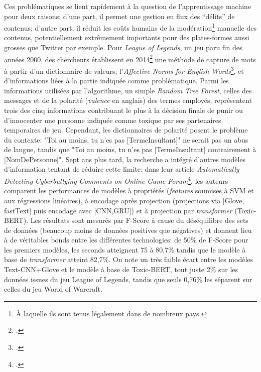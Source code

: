Ces problématiques se lient rapidement à la question de l'apprentissage machine pour deux raisons: d'une part, il permet une gestion en flux des \enquote{délits} de contenus; d'autre part, il réduit les coûts humains de la modération\footnote{À laquelle ils sont tenus légalement dans de nombreux pays.} manuelle des contenus, potentiellement extrêmement importants pour des plates-formes aussi grosses que Twitter par exemple. Pour \textit{League of Legends}, un jeu paru fin des années 2000, des chercheurs établissent en 2014\footcite{blackburn_stfu_2014} une méthode de capture de mots à partir d'un dictionnaire de valeurs, l'\textit{Affective Norms for English Words}\footcite{bradley_affective_1999}, et d'informations liées à la partie indiquée comme problématique. Parmi les informations utilisées par l'algorithme, un simple \textit{Random Tree Forest}, celles des messages et de la polarité (\textit{valence} en anglais) des termes employés, représentent trois des cinq informations contribuant le plus à la décision finale de punir ou d'innocenter une personne indiquée comme toxique par ses partenaires temporaires de jeu. Cependant, les dictionnaires de polarité posent le problème du contexte: "Toi au moins, tu n'es pas [TermeInsultant]" ne serait pas un abus de langue, tandis que "Toi au moins, tu n'es pas [TermeInsultant] contrairement à [NomDePersonne]". Sept ans plus tard, la recherche a intégré d'autres modèles d'information tentant de réduire cette limite: dans leur article \textit{Automatically Detecting Cyberbullying Comments on Online Game Forum}\footcite{vo_automatically_2021}, les auteurs comparent les performances de modèles à propriétés (\textit{features} soumises à SVM et aux régressions linéaires), à encodage après projection (projections via [Glove, fastText] puis encodage avec [CNN,GRU]) et à projection par \textit{transformer} (Toxic-BERT). Les résultats sont mesurés par F-Score à cause du déséquilibre des sets de données (beaucoup moins de données positives que négatives) et donnent lieu à de véritables bonds entre les différentes technologies: de 50\% de F-Score pour les premiers modèles, les seconds atteignent 75 à 80,7\% tandis que le modèle à base de \textit{transformer} atteint 82,7\%. On note un très faible écart entre les modèles Text-CNN+Glove et le modèle à base de Toxic-BERT, tout juste 2\% sur les données issues du jeu League of Legends, tandis que seuls 0,76\% les séparent sur celles du jeu World of Warcraft.

